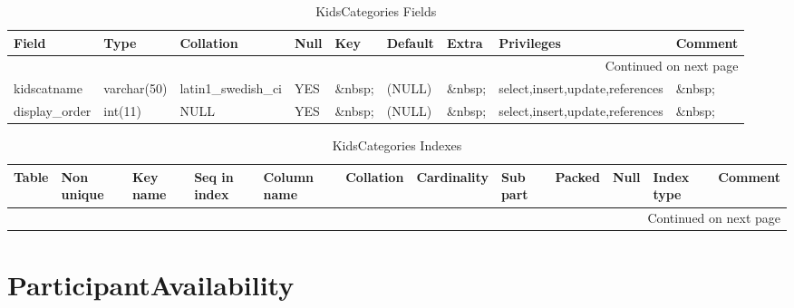 \documentclass[tablesignature,landscape]{scrartcl}
\begin{document}
\begin{longtable}{|l|l|l|l|l|l|l|l|l|}
\caption{KidsCategories Fields} \label{tbl:kidscategoriesfields}\\
\hline
 Field             &  Type         &  Collation                &  Null     &  Key      &  Default  &  Extra              &  Privileges                       &  Comment \\
\hline
\endhead
\hline\multicolumn{9}{r}{Continued on next page}\
\endfoot
\endlastfoot
\hline
 kidscatid         &  int(11)      &  NULL                     &  \&nbsp;  &  PRI      &  (NULL)   &  auto\_{}increment  &  select,insert,update,references  &  \&nbsp;  \\
 kidscatname       &  varchar(50)  &  latin1\_{}swedish\_{}ci  &  YES      &  \&nbsp;  &  (NULL)   &  \&nbsp;            &  select,insert,update,references  &  \&nbsp;  \\
 display\_{}order  &  int(11)      &  NULL                     &  YES      &  \&nbsp;  &  (NULL)   &  \&nbsp;            &  select,insert,update,references  &  \&nbsp;  \\
\hline
\end{longtable}


\begin{longtable}{|l|l|l|l|l|l|l|l|l|l|l|l|}
\caption{KidsCategories Indexes} \label{tbl:kidscategoriesindexes}\\
\hline
 Table           &  Non unique  &  Key name  &  Seq in index  &  Column name  &  Collation  &  Cardinality  &  Sub part  &  Packed  &  Null     &  Index type  &  Comment \\
\hline
\endhead
\hline\multicolumn{12}{r}{Continued on next page}\
\endfoot
\endlastfoot
\hline
 KidsCategories  &           0  &  PRIMARY   &             1  &  kidscatid    &  A          &            4  &  (NULL)    &  (NULL)  &  \&nbsp;  &  BTREE       &  \&nbsp;  \\
\hline
\end{longtable}
\section{ParticipantAvailability}
\label{sec-5}
\end{document}
